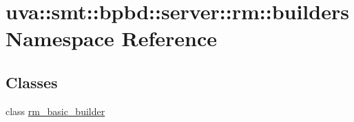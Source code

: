 \hypertarget{namespaceuva_1_1smt_1_1bpbd_1_1server_1_1rm_1_1builders}{}\section{uva\+:\+:smt\+:\+:bpbd\+:\+:server\+:\+:rm\+:\+:builders Namespace Reference}
\label{namespaceuva_1_1smt_1_1bpbd_1_1server_1_1rm_1_1builders}
\subsection*{Classes}
\begin{DoxyCompactItemize}
\item 
class \hyperlink{classuva_1_1smt_1_1bpbd_1_1server_1_1rm_1_1builders_1_1rm__basic__builder}{rm\+\_\+basic\+\_\+builder}
\end{DoxyCompactItemize}
